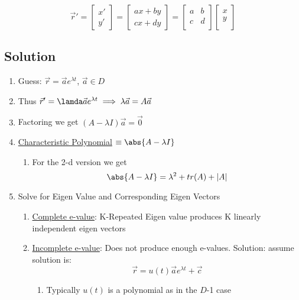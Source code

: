 \documentclass[11pt]{article}
\begin{document}
    \begin{equation}
    \vec{r}' = \left [
    \begin{array}{c}
    x' \\
    y'
    \end{array} \right ] = \left [
    \begin{array}{c}
    ax+by\\
    cx+dy
    \end{array} \right ] = \left [
    \begin{array}{cc}
    a & b\\
    c & d\\
    \end{array} \right ] \left [
    \begin{array}{c}
    x\\
    y\\
    \end{array} \right ]
    \end{equation}
\subsection{Solution}
\label{sec-10-2}

\begin{enumerate}
\item Guess: $\vec{r} = \vec{a} e^{\lambda t}$, $\vec{a} \in D$
\item Thus $\vec{r}' = \lamda \vec{a} e^{\lambda t} \implies \lambda
      \vec{a} = A \vec{a}$
\item Factoring we get $(A-\lambda I)\vec{a} = \vec{0}$
\item \underline{Characteristic Polynomial} $\equiv \abs{A-\lambda I}$
\begin{enumerate}
\item For the 2-d version we get
         \begin{equation}
         \abs{A-\lambda I} = \lambda^2 + tr(A) + |A|
         \end{equation}
\end{enumerate}
\item Solve for Eigen Value and Corresponding Eigen Vectors
\begin{enumerate}
\item \underline{Complete e-value}: K-Repeated Eigen value produces K linearly
         independent eigen vectors
\item \underline{Incomplete e-value}: Does not produce enough
         e-values. Solution: assume solution is:
         \begin{equation}
         \vec{r} = u(t)\vec{a}e^{\lambda t} + \vec{c}
         \end{equation}
\begin{enumerate}
\item Typically $u(t)$ is a polynomial as in the $D$-1 case
\end{enumerate}
\end{enumerate}
\end{enumerate}
\end{document}
